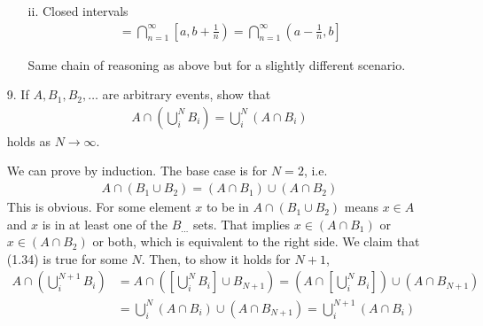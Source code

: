 \begin{enumerate}
\begin{itemize}
\begin{solution}
        \end{solution}
        \item[ii.] Closed intervals \begin{align}
            [a,b] = \bigcap_{n=1}^\infty \left[ a, b + \frac{1}{n} \right) = \bigcap_{n=1}^\infty \left( a - \frac{1}{n}, b \right]
        \end{align}
        \begin{solution}
            Same chain of reasoning as above but for a slightly different scenario.
        \end{solution}
    \end{itemize}
    \item[9.] If $A, B_1, B_2, \ldots$ are arbitrary events, show that
    \begin{align}
        A \cap \left( \bigcup_i^N B_i \right) = \bigcup_i^N \left( A \cap B_i \right)
    \end{align}
    holds as $N \to \infty$.
    \begin{solution}
        We can prove by induction. The base case is for $N=2$, i.e.
        \begin{align}
            A \cap (B_1 \cup B_2) = (A \cap B_1) \cup (A \cap B_2)
        \end{align}
        This is obvious. For some element $x$ to be in $A \cap (B_1 \cup B_2)$ means $x \in A$ and $x$ is in at least one of the $B_{\ldots}$ sets. That implies $x \in (A \cap B_1)$ or $x \in (A \cap B_2)$ or both, which is equivalent to the right side. We claim that (1.34) is true for some $N$. Then, to show it holds for $N+1$,
        \begin{align}
            A \cap \left( \bigcup_i^{N+1} B_i \right) &= A \cap \left( \left[\bigcup_i^{N} B_i\right] \cup B_{N+1}\right) = \left( A \cap \left[\bigcup_i^{N} B_i\right] \right) \cup \left( A \cap B_{N+1} \right)\\
            &= \bigcup_i^N \left( A \cap B_i \right) \cup \left( A \cap B_{N+1} \right) = \bigcup_i^{N+1} \left( A \cap B_i \right)
        \end{align}
    \end{solution}
\end{enumerate}
